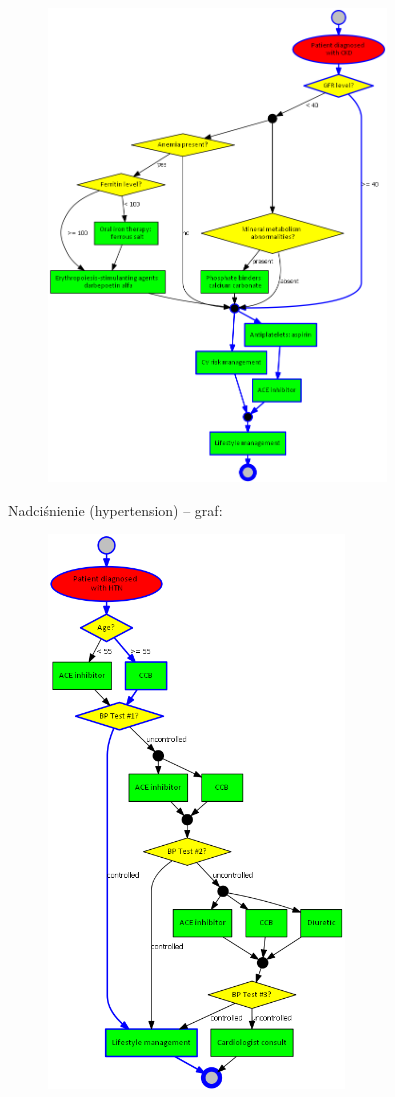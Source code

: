 \begin{figure}[H]
\centering
\includegraphics[width=0.8\textwidth]{img/ckd-simplified-ver-5.png}
\end{figure}
\newpage
Nadciśnienie (hypertension) – graf:
\begin{figure}[H]
\centering
\includegraphics[width=0.7\textwidth]{img/htn-ver-3.png}
\end{figure}
